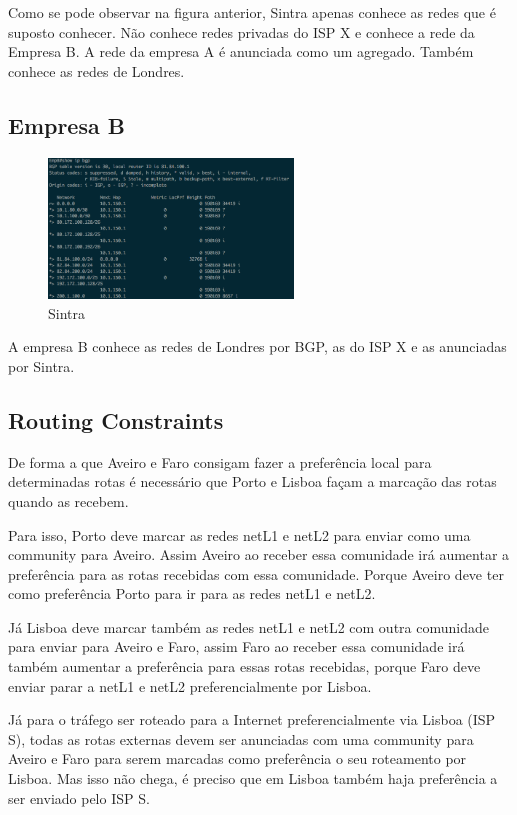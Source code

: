 \documentclass[pdftex,12pt,a4paper]{report}
\begin{document}
Como se pode observar na figura anterior, Sintra apenas conhece as redes que é suposto conhecer. Não conhece redes privadas do ISP X e conhece a rede da Empresa B. A rede da empresa A é anunciada como um agregado. Também conhece as redes de Londres.

\newpage

\subsection{Empresa B}

\begin{figure}[!htb]
\center
 \includegraphics[width=65mm,scale=1]{imagens/showipbgp_empb.png}
 \caption{Sintra}
 \label{fig:mapadeips}
\end{figure}

A empresa B conhece as redes de Londres por BGP, as do ISP X e as anunciadas por Sintra.

\subsection{Routing Constraints}

De forma a que Aveiro e Faro consigam fazer a preferência local para determinadas rotas é necessário que Porto e Lisboa façam a marcação das rotas quando as recebem. 

Para isso, Porto deve marcar as redes netL1 e netL2 para enviar como uma community para Aveiro. Assim Aveiro ao receber essa comunidade irá aumentar a preferência para as rotas recebidas com essa comunidade. Porque Aveiro deve ter como preferência Porto para ir para as redes netL1 e netL2.

Já Lisboa deve marcar também as redes netL1 e netL2 com outra comunidade para enviar para Aveiro e Faro, assim Faro ao receber essa comunidade irá também aumentar a preferência para essas rotas recebidas, porque Faro deve enviar parar a netL1 e netL2 preferencialmente por Lisboa.

Já para o tráfego ser roteado para a Internet preferencialmente via Lisboa (ISP S), todas as rotas externas devem ser anunciadas  com uma community para Aveiro e Faro para serem marcadas como preferência o seu roteamento por Lisboa. Mas isso não chega, é preciso que em Lisboa também haja preferência a ser enviado pelo ISP S.
\end{document}
